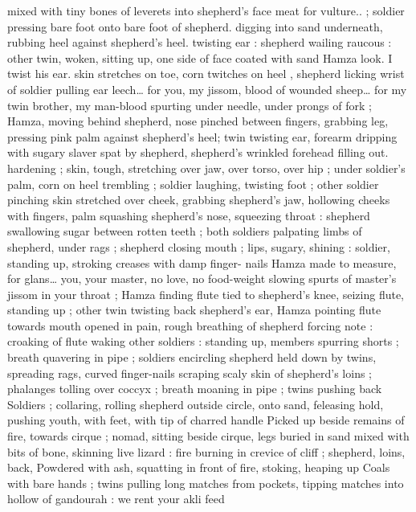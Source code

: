{mixed with tiny bones of leverets into shepherd's face{\td} {\gl} meat for 
vulture..{\gr} ; soldier pressing bare foot onto bare foot of shepherd. 
digging into sand underneath, rubbing heel against shepherd's heel. 
twisting ear : shepherd wailing raucous : other twin, woken, sitting 
up, one side of face coated with sand{\td} {\gl} Hamza{\td} look. I twist his ear. 
skin stretches on toe, corn twitches on heel{\td} {\gr}, shepherd licking wrist 
of soldier pulling ear{\td} {\gl} leech{\ldots} for you, my jissom, blood of wounded 
sheep{\ldots} for my twin brother, my man-blood spurting under needle, 
under prongs of fork{\td} {\gr} ; Hamza, moving behind shepherd, nose 
pinched between fingers, grabbing leg, pressing pink palm against 
shepherd's heel; twin twisting ear, forearm dripping with sugary 
slaver spat by shepherd, shepherd's wrinkled forehead filling out. 
hardening ; skin, tough, stretching over jaw, over torso, over hip ; 
under soldier's palm, corn on heel trembling ; soldier laughing, 
twisting foot ; other soldier pinching skin stretched over cheek, 
grabbing shepherd's jaw, hollowing cheeks with fingers, palm 
squashing shepherd's nose, squeezing throat : shepherd swallowing 
sugar between rotten teeth ; both soldiers palpating limbs of 
shepherd, under rags ; shepherd closing mouth ; lips, sugary, 
shining : soldier, standing up, stroking creases with damp finger- 
nails{\td} {\gl} Hamza{\td} made to measure, for glans{\ldots} you, your master, no 
love, no food-weight slowing spurts of master's jissom in your 
throat{\td} {\gr} ; Hamza finding flute tied to shepherd's knee, seizing flute, 
standing up ; other twin twisting back shepherd's ear, Hamza pointing 
flute towards mouth opened in pain, rough breathing of shepherd 
forcing note : croaking of flute waking other soldiers : standing up, 
members spurring shorts ; breath quavering in pipe ; soldiers 
encircling shepherd held down by twins, spreading rags, curved 
finger-nails scraping scaly skin of shepherd's loins ; phalanges 
tolling over coccyx ; breath moaning in pipe ; twins pushing back 
Soldiers ; collaring, rolling shepherd outside circle, onto sand, 
feleasing hold, pushing youth, with feet, with tip of charred handle 
Picked up beside remains of fire, towards cirque ; nomad, sitting 
beside cirque, legs buried in sand mixed with bits of bone, skinning 
live lizard : fire burning in crevice of cliff ; shepherd, loins, back, 
Powdered with ash, squatting in front of fire, stoking, heaping up 
Coals with bare hands ; twins pulling long matches from pockets, 
tipping matches into hollow of gandourah : {\gl} we rent your akli{\td} feed 
}
